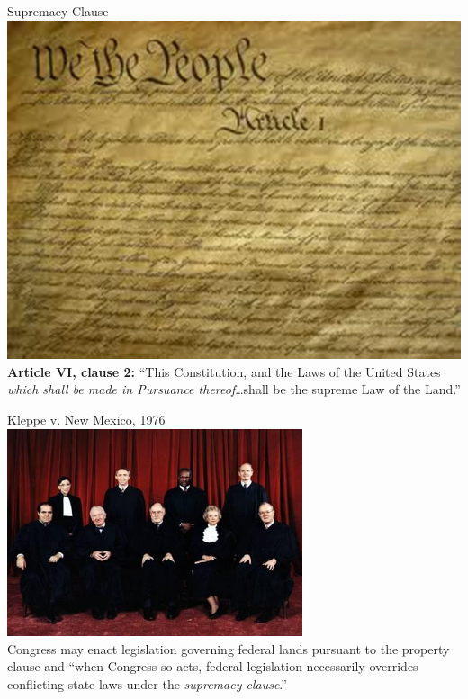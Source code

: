 \begin{frame}{Supremacy Clause}
   \centering
   \includegraphics[height=.7\textheight]{img/constitution.png} \\
   \textbf{Article VI, clause 2:} ``This Constitution, and the Laws of the
   United States \emph{which shall be made in Pursuance thereof}\ldots shall be
   the supreme Law of the Land.''
\end{frame}


\begin{frame}{Kleppe v. New Mexico, 1976}
    \centering
    \includegraphics[width=0.65\textwidth]{img/sc-1976.png} \\
    Congress may enact legislation governing federal lands pursuant to the
    property clause and ``when Congress so acts, federal legislation
    necessarily overrides conflicting state laws under the \emph{supremacy
    clause}.''
\end{frame}

